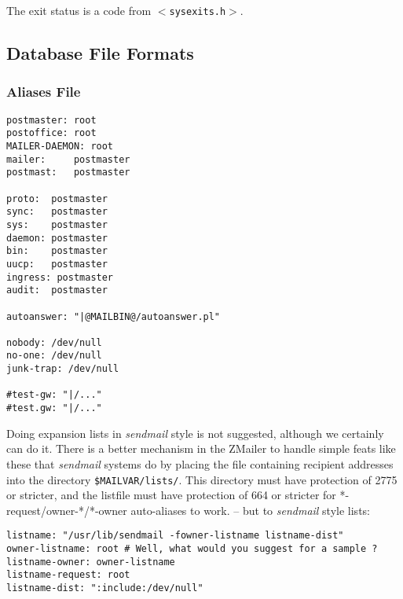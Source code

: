 The exit status is a code from {\tt {\(<\)}sysexits.h{\(>\)}}.



\subsection{Database File Formats}



\subsubsection{Aliases File}



\begin{verbatim}
postmaster: root
postoffice: root
MAILER-DAEMON: root
mailer:     postmaster
postmast:   postmaster

proto:  postmaster
sync:   postmaster
sys:    postmaster
daemon: postmaster
bin:    postmaster
uucp:   postmaster
ingress: postmaster
audit:  postmaster

autoanswer: "|@MAILBIN@/autoanswer.pl"

nobody: /dev/null
no-one: /dev/null
junk-trap: /dev/null

#test-gw: "|/..."
#test.gw: "|/..."
\end{verbatim}

Doing expansion lists in {\em sendmail\/} style is not suggested, although
we certainly can do it.  There is a better mechanism in the ZMailer
to handle simple feats like these that {\em sendmail\/} systems do by placing
the file containing recipient addresses into the directory  
{\tt \$MAILVAR/lists/}.
This directory must have protection of 2775 or stricter, and the listfile
must have protection of 664 or stricter for *-request/owner-*/*-owner
auto-aliases to work. -- but to {\em sendmail\/} style lists:

\begin{verbatim}
listname: "/usr/lib/sendmail -fowner-listname listname-dist"
owner-listname: root # Well, what would you suggest for a sample ?
listname-owner: owner-listname
listname-request: root
listname-dist: ":include:/dev/null"
\end{verbatim}

